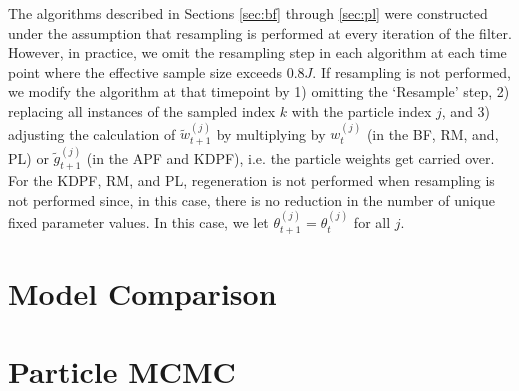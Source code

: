 The algorithms described in Sections \ref{sec:bf} through \ref{sec:pl} were constructed under the assumption that resampling is performed at every iteration of the filter. However, in practice, we omit the resampling step in each algorithm at each time point where the effective sample size exceeds $0.8J$. If resampling is not performed, we modify the algorithm at that timepoint by 1) omitting the `Resample' step, 2) replacing all instances of the sampled index $k$ with the particle index $j$, and 3) adjusting the calculation of $\tilde{w}_{t+1}^{(j)}$ by multiplying by $w_t^{(j)}$ (in the BF, RM, and, PL) or $\tilde{g}^{(j)}_{t+1}$ (in the APF and KDPF), i.e. the particle weights get carried over. For the KDPF, RM, and PL, regeneration is not performed when resampling is not performed since, in this case, there is no reduction in the number of unique fixed parameter values. In this case, we let $\theta_{t+1}^{(j)} = \theta_t^{(j)}$ for all $j$.

\section{Model Comparison \label{sec:comp}}

%
%
%

\section{Particle MCMC \label{sec:pmcmc}}